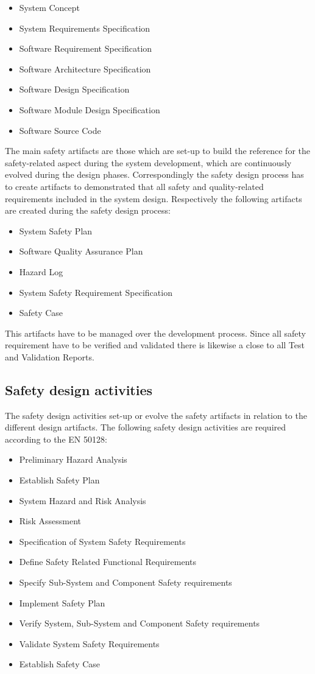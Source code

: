 \documentclass{template/openetcs_article}
\begin{document}
\begin{itemize}
\item System Concept
\item System Requirements Specification
\item Software Requirement Specification
\item Software Architecture Specification
\item Software Design Specification
\item Software Module Design Specification
\item Software Source Code
\end{itemize}

The main safety artifacts are those which are set-up to build the reference for the safety-related aspect during the system development, which are continuously evolved during the design phases. Correspondingly the safety design process has to create artifacts to demonstrated that all safety and quality-related requirements included in the system design. Respectively the following artifacts are created during the safety design process:

\begin{itemize}
\item System Safety Plan
\item Software Quality Assurance Plan
\item Hazard Log
\item System Safety Requirement Specification
\item Safety Case
\end{itemize} 

This artifacts have to be managed over the development process. Since all safety requirement have to be verified and validated there is likewise a close to all Test and Validation Reports.

\subsection{Safety design activities}
\label{safetyactivities}
The safety design activities set-up or evolve the safety artifacts in relation to the different design artifacts. The following safety design activities are required according to the EN 50128:

\begin{itemize}
\item Preliminary Hazard Analysis
\item Establish Safety Plan
\item System Hazard and Risk Analysis
\item Risk Assessment
\item Specification of System Safety Requirements
\item Define Safety Related Functional Requirements
\item Specify Sub-System and Component Safety requirements
\item Implement Safety Plan
\item Verify System, Sub-System and Component Safety requirements
\item Validate System Safety Requirements
\item Establish Safety Case
\end{itemize}
\end{document}

